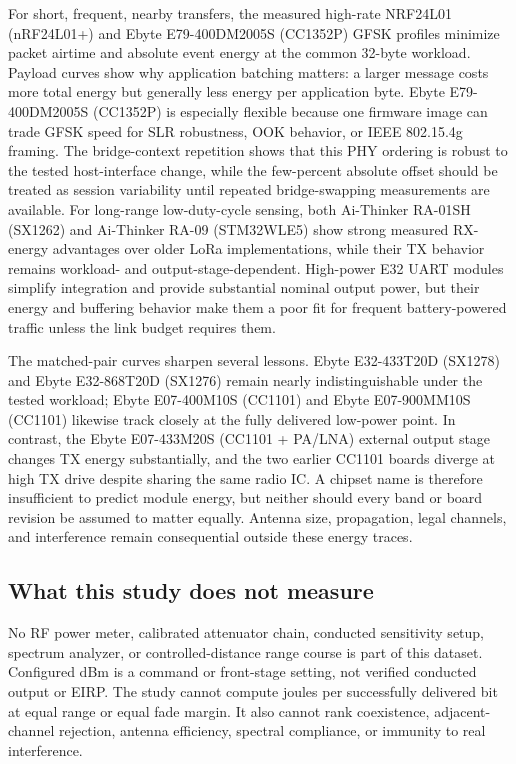 \documentclass[10pt,a4paper]{article}
\begin{document}
For short, frequent, nearby transfers, the measured high-rate NRF24L01 (nRF24L01+) and Ebyte E79-400DM2005S (CC1352P) GFSK profiles minimize packet airtime and absolute event energy at the common 32-byte workload. Payload curves show why application batching matters: a larger message costs more total energy but generally less energy per application byte. Ebyte E79-400DM2005S (CC1352P) is especially flexible because one firmware image can trade GFSK speed for SLR robustness, OOK behavior, or IEEE 802.15.4g framing. The bridge-context repetition shows that this PHY ordering is robust to the tested host-interface change, while the few-percent absolute offset should be treated as session variability until repeated bridge-swapping measurements are available. For long-range low-duty-cycle sensing, both Ai-Thinker RA-01SH (SX1262) and Ai-Thinker RA-09 (STM32WLE5) show strong measured RX-energy advantages over older LoRa implementations, while their TX behavior remains workload- and output-stage-dependent. High-power E32 UART modules simplify integration and provide substantial nominal output power, but their energy and buffering behavior make them a poor fit for frequent battery-powered traffic unless the link budget requires them.

The matched-pair curves sharpen several lessons. Ebyte E32-433T20D (SX1278) and Ebyte E32-868T20D (SX1276) remain nearly indistinguishable under the tested workload; Ebyte E07-400M10S (CC1101) and Ebyte E07-900MM10S (CC1101) likewise track closely at the fully delivered low-power point. In contrast, the Ebyte E07-433M20S (CC1101 + PA/LNA) external output stage changes TX energy substantially, and the two earlier CC1101 boards diverge at high TX drive despite sharing the same radio IC. A chipset name is therefore insufficient to predict module energy, but neither should every band or board revision be assumed to matter equally. Antenna size, propagation, legal channels, and interference remain consequential outside these energy traces.

\subsection{What this study does not measure}

No RF power meter, calibrated attenuator chain, conducted sensitivity setup, spectrum analyzer, or controlled-distance range course is part of this dataset. Configured dBm is a command or front-stage setting, not verified conducted output or EIRP. The study cannot compute joules per successfully delivered bit at equal range or equal fade margin. It also cannot rank coexistence, adjacent-channel rejection, antenna efficiency, spectral compliance, or immunity to real interference.
\end{document}
